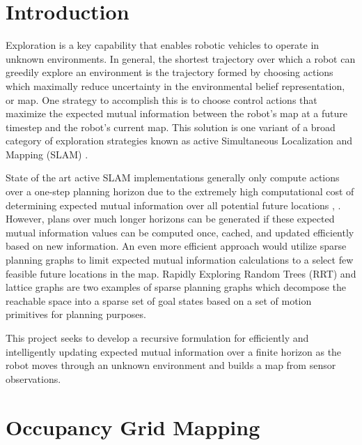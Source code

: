 \section{Introduction}
\label{section:introduction}

Exploration is a key capability that enables robotic vehicles to operate in unknown environments.
In general, the shortest trajectory over which a robot can greedily explore an environment is the trajectory formed by choosing actions which maximally reduce uncertainty in the environmental belief representation, or map.
One strategy to accomplish this is to choose control actions that maximize the expected mutual information between the robot's map at a future timestep and the robot's current map.
This solution is one variant of a broad category of exploration strategies known as active Simultaneous Localization and Mapping (SLAM) \cite{thrun2005probabilistic}.

State of the art active SLAM implementations generally only compute actions over a one-step planning horizon due to the extremely high computational cost of determining expected mutual information over all potential future locations \cite{bourgault2002information}, \cite{stachniss2005information}.
However, plans over much longer horizons can be generated if these expected mutual information values can be computed once, cached, and updated efficiently based on new information.
An even more efficient approach would utilize sparse planning graphs to limit expected mutual information calculations to a select few feasible future locations in the map.
Rapidly Exploring Random Trees (RRT) and lattice graphs are two examples of sparse planning graphs which decompose the reachable space into a sparse set of goal states based on a set of motion primitives for planning purposes.

This project seeks to develop a recursive formulation for efficiently and intelligently updating expected mutual information over a finite horizon as the robot moves through an unknown environment and builds a map from sensor observations.


\section{Occupancy Grid Mapping}
\label{section:occupancy_grid_mapping}

